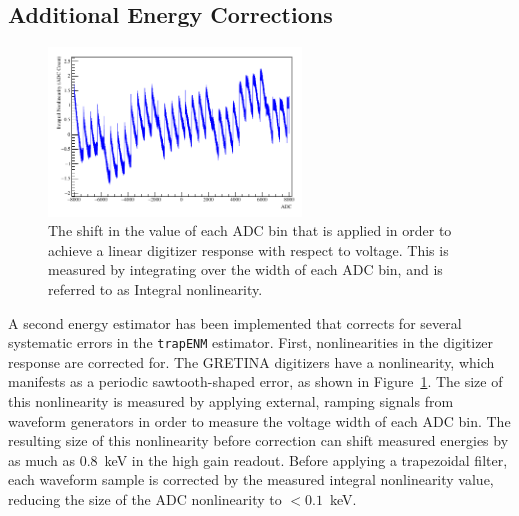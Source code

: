 \documentclass[/main.tex]{subfiles}
\begin{document}
\subsection{Additional Energy Corrections} \label{sec:energy}
\begin{figure}
  \centering
  \includegraphics[width=0.6\textwidth]{dignonlin}
  \caption[Integral digitizer nonlinearity]{\label{fig:localnonlin}
    The shift in the value of each ADC bin that is applied in order to achieve a linear digitizer response with respect to voltage. This is measured by integrating over the width of each ADC bin, and is referred to as Integral nonlinearity.
  }
\end{figure}
A second energy estimator has been implemented that corrects for several systematic errors in the \texttt{trapENM} estimator\cite{energyunidoc}.
First, nonlinearities in the digitizer response are corrected for.
The GRETINA digitizers have a nonlinearity, which manifests as a periodic sawtooth-shaped error, as shown in Figure~\ref{fig:localnonlin}.
The size of this nonlinearity is measured by applying external, ramping signals from waveform generators in order to measure the voltage width of each ADC bin.
The resulting size of this nonlinearity before correction can shift measured energies by as much as 0.8~keV in the high gain readout.
Before applying a trapezoidal filter, each waveform sample is corrected by the measured integral nonlinearity value, reducing the size of the ADC nonlinearity to $<0.1$~keV.
\end{document}
